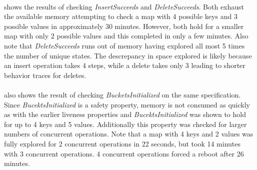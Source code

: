 \documentclass{uit-thesis}
\begin{document}
\\
 shows the results of checking \textit{InsertSucceeds} and \textit{DeleteSucceeds}. Both exhaust the available memory attempting to check a map with 4 possible keys and 3 possible values in approximately 30 minutes. However, both hold for a smaller map with only 2 possible values and this completed in only a few minutes. Also note that \textit{DeleteSucceeds} runs out of memory having explored all most 5 times the number of unique states. The descrepancy in space explored is likely because an insert operation takes 4 steps, while a delete takes only 3 leading to shorter behavior traces for deletes.
\\\\
 also shows the result of checking \textit{BucketsInitialized} on the same specification. Since \textit{BucektsInitialized} is a safety property, memory is not consumed as quickly as with the earlier liveness properties and \textit{BucektsInitialized} was shown to hold for up to 4 keys and 5 values. Additionally this property was checked for larger numbers of concurrent operations. Note that a map with 4 keys and 2 values was fully explored for 2 concurrent operations in 22 seconds, but took 14 minutes with 3 concurrent operations. 4 concurrent operations forced a reboot after 26 minutes.
\end{document}
